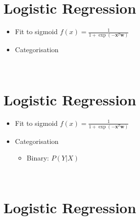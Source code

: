 \documentclass[11pt]{article}
\begin{document}
\newpage
\hypertarget{logistic-regression}{%
\section*{Logistic Regression}\label{logistic-regression2}}

\begin{itemize}
    \item Fit to sigmoid $f(x) = \frac{1}{1 + \exp(-\boldsymbol{x}^T\boldsymbol{w})}$
\end{itemize}
\begin{center}
\end{center}
\begin{itemize}
    \item Categorisation
\end{itemize}
{ \hspace*{\fill} \\}

\newpage
\hypertarget{logistic-regression}{%
\section*{Logistic Regression}\label{logistic-regression3}}

\begin{itemize}
    \item Fit to sigmoid $f(x) = \frac{1}{1 + \exp(-\boldsymbol{x}^T\boldsymbol{w})}$
\end{itemize}
\begin{center}
\end{center}
\begin{itemize}
    \item Categorisation
        \begin{itemize}
            \item Binary: $P(Y|X)$
        \end{itemize}
\end{itemize}
{ \hspace*{\fill} \\}

\newpage
\hypertarget{logistic-regression}{%
\section*{Logistic Regression}\label{logistic-regression4}}
\end{document}
